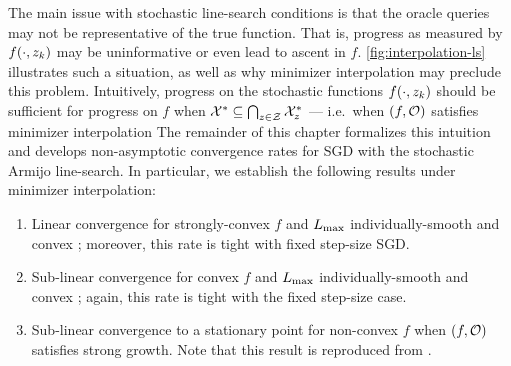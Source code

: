 The main issue with stochastic line-search conditions is that the oracle queries may not be representative of the true function. 
That is, progress as measured by \( f(\cdot, \zk) \) may be uninformative or even lead to ascent in \( f \). 
\autoref{fig:interpolation-ls} illustrates such a situation, as well as why minimizer interpolation may preclude this problem. 
Intuitively, progress on the stochastic functions \( f(\cdot, \zk) \) should be sufficient for progress on \( f \) when \( \calX^* \subseteq \bigcap_{\z \in \calZ} \calX^*_{\z} \) --- i.e.\ when \( \rbr{f, \oracle{}} \) satisfies minimizer interpolation 
The remainder of this chapter formalizes this intuition and develops non-asymptotic convergence rates for \ac{SGD} with the stochastic Armijo line-search. 
In particular, we establish the following results under minimizer interpolation:
\begin{enumerate}
    \item Linear convergence for strongly-convex \( f \) and \( \Lmax \) individually-smooth and convex \oracle{}; moreover, this rate is tight with fixed step-size \ac{SGD}. 
    \item Sub-linear convergence for convex \( f \) and \( \Lmax \) individually-smooth and convex \oracle{}; again, this rate is tight with the fixed step-size case.
    \item Sub-linear convergence to a stationary point for non-convex \( f \) when \( \rbr{f, \oracle{}} \) satisfies strong growth. Note that this result is reproduced from \citet{vaswani2019painless}.
\end{enumerate}

